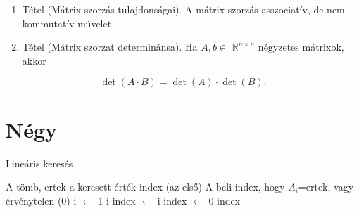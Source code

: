 \documentclass[twocolumn]{report}
\theoremstyle{definition} %
\begin{document}
\begin{enumerate}
  \item Tétel (Mátrix szorzás tulajdonságai). A mátrix szorzás asszociatív, de nem kommutatív múvelet.

  \item Tétel (Mátrix szorzat determinánsa). Ha $A, b \in$ $\mathbb{R}^{n \times n}$ négyzetes mátrixok, akkor

\end{enumerate}
$$
\operatorname{det}(A \cdot B)=\operatorname{det}(A) \cdot \operatorname{det}(B) .
$$

\chapter{Négy}
\hulipsum

\begin{algorithm}
\caption{Lineáris keresés}
\begin{algorithmic}[3]
\Require A tömb, ertek a keresett érték
\Ensure index (az első) A-beli index, hogy $A_i$=ertek, vagy érvénytelen (0)
\State i $\gets$ 1
\State {}i
\EndWhile
{}
\State index $\gets$ i
\Else
\State index $\gets$ 0
\EndIf
\State \Return index
\EndProcedure
\end{algorithmic}
\end{algorithm}

\hulipsum
\end{document}
